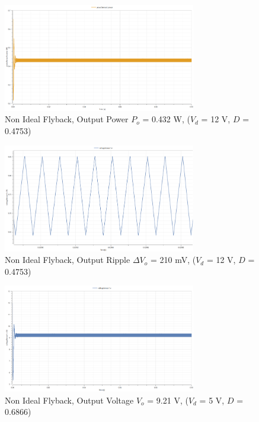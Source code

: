 \documentclass[12pt,twoside]{scrartcl}
\begin{document}
\begin{figure}[htp]
    \centering
    \includegraphics[width=0.75\textwidth]{PowerNonIdealSim12V.png}
    \caption{Non Ideal Flyback, Output Power $P_o$ = 0.432 W, ($V_d$ = 12 V, $D$ = 0.4753)}
    \label{fig:PowerNonIdealSim12V}
\end{figure}

\begin{figure}[htp]
    \centering
    \includegraphics[width=0.75\textwidth]{RippleNonIdealSim12V.png}
    \caption{Non Ideal Flyback, Output Ripple $\Delta V_o$ = 210 mV, ($V_d$ = 12 V, $D$ = 0.4753)}
    \label{fig:RippleNonIdealSim12V}
\end{figure}
\begin{figure}[htp]
    \centering
    \includegraphics[width=0.75\textwidth]{NonIdealSim5V(calculated).png}
    \caption{Non Ideal Flyback, Output Voltage $V_o$ = 9.21 V, ($V_d$ = 5 V, $D$ = 0.6866)}
    \label{fig:NonIdealSim5Vcal}
\end{figure}
\end{document}

